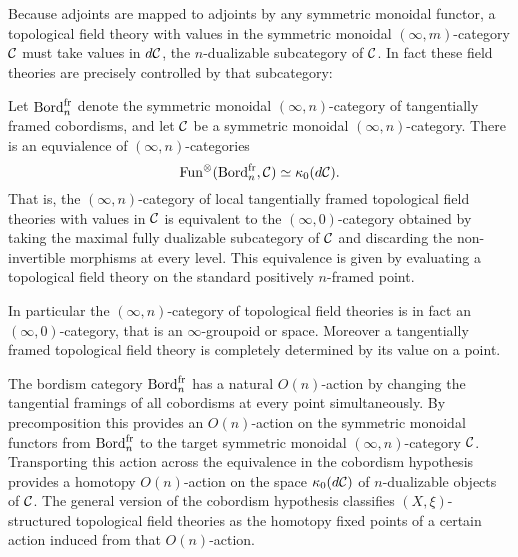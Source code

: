 \documentclass[a4paper]{amsart}
\begin{document}
Because adjoints are mapped to adjoints by any symmetric monoidal functor, a topological field theory with values in the symmetric monoidal $(\infty,m)$-category $\mathcal C$ must take values in $d\mathcal C$, the $n$-dualizable subcategory of $\mathcal C$. In fact these field theories are precisely controlled by that subcategory:

\begin{theorem}
	Let $\mathrm{Bord}^\mathrm{fr}_n$ denote the symmetric monoidal $(\infty,n)$-category of tangentially framed cobordisms, and let $\mathcal C$ be a symmetric monoidal $(\infty,n)$-category.  There is an equvialence of $(\infty,n)$-categories
	\begin{equation*}
		\operatorname{Fun}^\otimes(\mathrm{Bord}^\mathrm{fr}_n, \mathcal C) \simeq \kappa_0 (d\mathcal C).
	\end{equation*} 
	That is, the $(\infty,n)$-category of local tangentially framed topological field theories with values in $\mathcal C$ is equivalent to the $(\infty,0)$-category obtained by taking the maximal fully dualizable subcategory of $\mathcal C$ and discarding the non-invertible morphisms at every level. This equivalence is given by evaluating a topological field theory on the standard positively $n$-framed point. 
\end{theorem}

\noindent In particular the $(\infty,n)$-category of topological field theories is in fact an $(\infty,0)$-category, that is an $\infty$-groupoid or space. Moreover a tangentially framed topological field theory is completely determined by its value on a point. 

The bordism category $\mathrm{Bord}^\mathrm{fr}_n$ has a natural $O(n)$-action by changing the tangential framings of all cobordisms at every point simultaneously.  By precomposition this provides an $O(n)$-action on the symmetric monoidal functors from $\mathrm{Bord}^\mathrm{fr}_n$ to the target symmetric monoidal $(\infty,n)$-category $\mathcal C$.  Transporting this action across the equivalence in the cobordism hypothesis provides a homotopy $O(n)$-action on the space $\kappa_0(d\mathcal C)$ of $n$-dualizable objects of $\mathcal C$.  The general version of the cobordism hypothesis classifies $(X,\xi)$-structured topological field theories as the homotopy fixed points of a certain action induced from that $O(n)$-action.



\renewcommand{\theapptheorem}{B.\arabic{apptheorem}}
\setcounter{apptheorem}{0}
\end{document}
